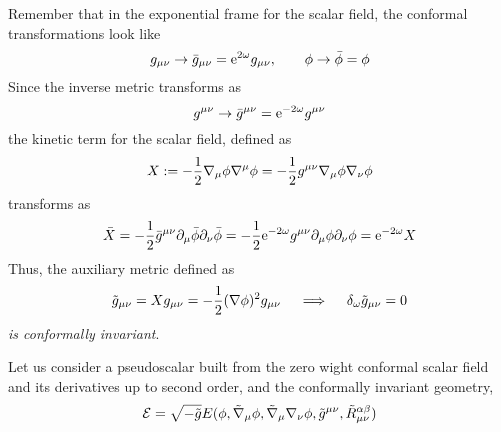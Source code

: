 Remember that in the exponential frame for the scalar field, the conformal transformations look like
\begin{equation}
  g_{\mu\nu }\to \bar{g}_{\mu\nu }= \mathrm{e}^{2\omega}g_{\mu\nu },\qquad \phi\to \bar{\phi }=\phi 
\end{equation}
Since the inverse metric transforms as
\begin{equation}
  g^{\mu\nu }\to \bar{g}^{\mu\nu }=\mathrm{e}^{-2\omega}g^{\mu\nu }
\end{equation}
the kinetic term for the scalar field, defined as
\begin{equation}
  X:=-\frac{1}{2}\nabla_\mu \phi \nabla^\mu \phi =-\frac{1}{2}g^{\mu\nu }\nabla_\mu \phi\nabla_\nu \phi 
\end{equation}
transforms as
\begin{equation}
  \bar{X}=-\frac{1}{2}\bar{g}^{\mu\nu }\partial_\mu \bar{\phi }\partial_\nu \bar{\phi }=-\frac{1}{2}\mathrm{e}^{-2\omega}g^{\mu\nu }\partial_\mu \phi\partial_\nu \phi =\mathrm{e}^{-2\omega}X
\end{equation}
Thus, the auxiliary metric defined as
\begin{equation}
  \tilde{g}_{\mu\nu }=Xg_{\mu\nu }=-\frac{1}{2}(\nabla\phi )^2g_{\mu\nu } \quad \implies\quad \delta_\omega\tilde{g}_{\mu\nu }=0
\end{equation}
\textit{is conformally invariant}.

Let us consider a pseudoscalar built from the zero wight conformal scalar field and its derivatives up to second order, and the conformally invariant geometry,
\begin{equation}
  \mathcal{E}=\sqrt{-\tilde{g}}E(\phi,\tilde{\nabla}_\mu\phi ,\tilde{\nabla}_\mu\nabla_\nu \phi ,\tilde{g}^{\mu\nu },\tilde{R}_{\mu\nu }^{\alpha\beta })
\end{equation}

